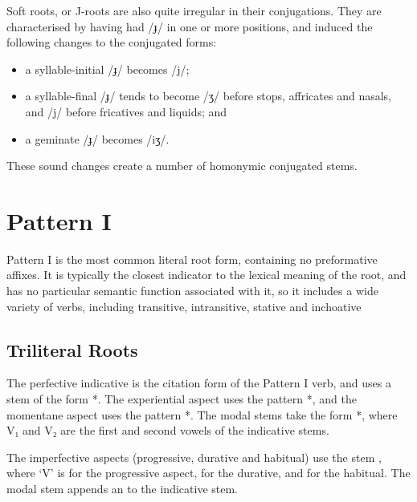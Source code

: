 \documentclass[grammar]{subfiles}
\begin{document}
Soft roots, or J-roots are also quite irregular in their conjugations. They are
characterised by having had /ɟ/ in one or more positions, and induced the
following changes to the conjugated forms: 

\begin{itemize}
  \item a syllable-initial /ɟ/ becomes /j/; 
  \item a syllable-final /ɟ/ tends to become /ʒ/ before stops, affricates and
    nasals, and /j/ before fricatives and liquids; and
  \item a geminate /ɟ/ becomes /iʒ/. 
\end{itemize}

These sound changes create a number of homonymic conjugated stems. 


\section{Pattern I}
\label{sec:vm_verb_pattern_i}

Pattern I is the most common literal root form, containing no preformative
affixes.  It is typically the closest indicator to the lexical meaning of the
root, and has no particular semantic function associated with it, so it
includes a wide variety of verbs, including transitive, intransitive, stative
and inchoative


\subsection{Triliteral Roots}
\label{ssec:vm_i_triliteral}
%
%

The perfective indicative is the citation form of the Pattern I verb, and uses
a stem of the form *.  The experiential aspect uses the pattern
*, and the momentane aspect uses the pattern *.  The
modal stems take the form *, where V₁ and V₂ are the first and
second vowels of the indicative stems. 

The imperfective aspects (progressive, durative and  habitual) use the stem
, where ‘V’ is  for the progressive aspect,
 for the durative, and  for the habitual.  The modal stem
appends an  to the indicative stem. 
\end{document}
